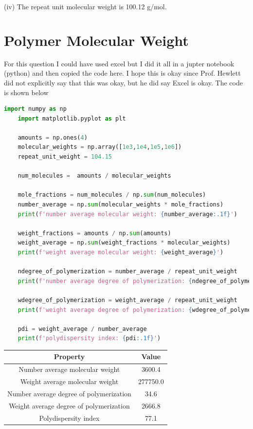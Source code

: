 \documentclass{article}
\begin{document}
(iv) The repeat unit molecular weight is 100.12 g/mol.

\section{Polymer Molecular Weight}

For this question I could have used excel but I did it all in a jupter notebook (python) and then copied the code here. I hope this is okay since Prof. Hewlett did not explicitly say that this was okay, but he did say Excel is okay. The code is shown below

\begin{lstlisting}[language=Python]
    import numpy as np
    import matplotlib.pyplot as plt

    amounts = np.ones(4)
    molecular_weights = np.array([1e3,1e4,1e5,1e6])
    repeat_unit_weight = 104.15

    num_molecules =  amounts / molecular_weights

    mole_fractions = num_molecules / np.sum(num_molecules)
    number_average = np.sum(molecular_weights * mole_fractions)
    print(f'number average molecular weight: {number_average:.1f}')

    weight_fractions = amounts / np.sum(amounts)
    weight_average = np.sum(weight_fractions * molecular_weights) 
    print(f'weight average molecular weight: {weight_average}')

    ndegree_of_polymerization = number_average / repeat_unit_weight
    print(f'number average degree of polymerization: {ndegree_of_polymerization:.1f}')

    wdegree_of_polymerization = weight_average / repeat_unit_weight
    print(f'weight average degree of polymerization: {wdegree_of_polymerization:.1f}')

    pdi = weight_average / number_average
    print(f'polydispersity index: {pdi:.1f}')
\end{lstlisting}
\begin{table}[H]
    \centering
    \begin{tabular}{cc}
        \toprule
        \textbf{Property} & \textbf{Value} \\
        \midrule
        Number average molecular weight & 3600.4 \\
        Weight average molecular weight & 277750.0 \\
        Number average degree of polymerization & 34.6 \\
        Weight average degree of polymerization & 2666.8 \\
        Polydispersity index & 77.1 \\
        \bottomrule
    \end{tabular}
    \label{tab:polymer_molecular_weight}
\end{table}
\end{document}
